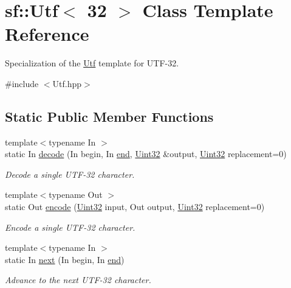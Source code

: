\hypertarget{classsf_1_1_utf_3_0132_01_4}{\section{sf\-:\-:Utf$<$ 32 $>$ Class Template Reference}
\label{classsf_1_1_utf_3_0132_01_4}
}


Specialization of the \hyperlink{classsf_1_1_utf}{Utf} template for U\-T\-F-\/32.  




{\ttfamily \#include $<$Utf.\-hpp$>$}

\subsection*{Static Public Member Functions}
\begin{DoxyCompactItemize}
\item 
{\footnotesize template$<$typename In $>$ }\\static In \hyperlink{classsf_1_1_utf_3_0132_01_4_ad754ce8476f7b80563890dec12cefd46}{decode} (In begin, In \hyperlink{gl3_8h_a432111147038972f06e049e18a837002}{end}, \hyperlink{namespacesf_aa746fb1ddef4410bddf198ebb27e727c}{Uint32} \&output, \hyperlink{namespacesf_aa746fb1ddef4410bddf198ebb27e727c}{Uint32} replacement=0)
\begin{DoxyCompactList}\small\item\em Decode a single U\-T\-F-\/32 character. \end{DoxyCompactList}\item 
{\footnotesize template$<$typename Out $>$ }\\static Out \hyperlink{classsf_1_1_utf_3_0132_01_4_a27b9d3f3fc49a8c88d91966889fcfca1}{encode} (\hyperlink{namespacesf_aa746fb1ddef4410bddf198ebb27e727c}{Uint32} input, Out output, \hyperlink{namespacesf_aa746fb1ddef4410bddf198ebb27e727c}{Uint32} replacement=0)
\begin{DoxyCompactList}\small\item\em Encode a single U\-T\-F-\/32 character. \end{DoxyCompactList}\item 
{\footnotesize template$<$typename In $>$ }\\static In \hyperlink{classsf_1_1_utf_3_0132_01_4_a788b4ebc728dde2aaba38f3605d4867c}{next} (In begin, In \hyperlink{gl3_8h_a432111147038972f06e049e18a837002}{end})
\begin{DoxyCompactList}\small\item\em Advance to the next U\-T\-F-\/32 character. \end{DoxyCompactList}\item 

\end{DoxyCompactItemize}
